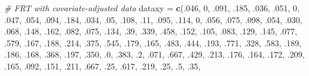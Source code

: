\documentclass[]{article}
\newenvironment{Shaded}{\begin{snugshade}}{\end{snugshade}}
\newcommand{\KeywordTok}[1]{\textcolor[rgb]{0.13,0.29,0.53}{\textbf{#1}}}
\newcommand{\DecValTok}[1]{\textcolor[rgb]{0.00,0.00,0.81}{#1}}
\newcommand{\StringTok}[1]{\textcolor[rgb]{0.31,0.60,0.02}{#1}}
\newcommand{\CommentTok}[1]{\textcolor[rgb]{0.56,0.35,0.01}{\textit{#1}}}
\newcommand{\NormalTok}[1]{#1}
\begin{document}
\begin{Shaded}
\begin{Highlighting}[]
\CommentTok{# FRT with covariate-adjusted data}
\NormalTok{dataxy =}\StringTok{ }\KeywordTok{c}\NormalTok{(.}\DecValTok{046}\NormalTok{, }\DecValTok{0}\NormalTok{, .}\DecValTok{091}\NormalTok{, .}\DecValTok{185}\NormalTok{, .}\DecValTok{036}\NormalTok{, .}\DecValTok{051}\NormalTok{, }\DecValTok{0}\NormalTok{, .}\DecValTok{047}\NormalTok{,}
\NormalTok{           .}\DecValTok{054}\NormalTok{, .}\DecValTok{094}\NormalTok{, .}\DecValTok{184}\NormalTok{, .}\DecValTok{034}\NormalTok{, .}\DecValTok{05}\NormalTok{, .}\DecValTok{108}\NormalTok{, .}\DecValTok{11}\NormalTok{, .}\DecValTok{095}\NormalTok{,}
\NormalTok{           .}\DecValTok{114}\NormalTok{, }\DecValTok{0}\NormalTok{, .}\DecValTok{056}\NormalTok{, .}\DecValTok{075}\NormalTok{, .}\DecValTok{098}\NormalTok{, .}\DecValTok{054}\NormalTok{, .}\DecValTok{030}\NormalTok{, .}\DecValTok{068}\NormalTok{,}
\NormalTok{           .}\DecValTok{148}\NormalTok{, .}\DecValTok{162}\NormalTok{, .}\DecValTok{082}\NormalTok{, .}\DecValTok{075}\NormalTok{, .}\DecValTok{134}\NormalTok{, .}\DecValTok{39}\NormalTok{, .}\DecValTok{339}\NormalTok{, .}\DecValTok{458}\NormalTok{,}
\NormalTok{           .}\DecValTok{152}\NormalTok{, .}\DecValTok{105}\NormalTok{, .}\DecValTok{083}\NormalTok{, .}\DecValTok{129}\NormalTok{, .}\DecValTok{145}\NormalTok{, .}\DecValTok{077}\NormalTok{, .}\DecValTok{579}\NormalTok{, .}\DecValTok{167}\NormalTok{, }
\NormalTok{           .}\DecValTok{188}\NormalTok{, .}\DecValTok{214}\NormalTok{, .}\DecValTok{375}\NormalTok{, .}\DecValTok{545}\NormalTok{, .}\DecValTok{179}\NormalTok{, .}\DecValTok{165}\NormalTok{, .}\DecValTok{483}\NormalTok{, .}\DecValTok{444}\NormalTok{,}
\NormalTok{           .}\DecValTok{193}\NormalTok{, .}\DecValTok{771}\NormalTok{, .}\DecValTok{328}\NormalTok{, .}\DecValTok{583}\NormalTok{, .}\DecValTok{189}\NormalTok{, .}\DecValTok{186}\NormalTok{, .}\DecValTok{168}\NormalTok{, .}\DecValTok{368}\NormalTok{,}
\NormalTok{           .}\DecValTok{197}\NormalTok{, .}\DecValTok{350}\NormalTok{, .}\DecValTok{0}\NormalTok{, .}\DecValTok{383}\NormalTok{, .}\DecValTok{2}\NormalTok{, .}\DecValTok{071}\NormalTok{, .}\DecValTok{667}\NormalTok{, .}\DecValTok{429}\NormalTok{,}
\NormalTok{           .}\DecValTok{213}\NormalTok{, .}\DecValTok{176}\NormalTok{, .}\DecValTok{164}\NormalTok{, .}\DecValTok{172}\NormalTok{, .}\DecValTok{209}\NormalTok{, .}\DecValTok{165}\NormalTok{, .}\DecValTok{092}\NormalTok{, .}\DecValTok{151}\NormalTok{,}
\NormalTok{           .}\DecValTok{211}\NormalTok{, .}\DecValTok{667}\NormalTok{, .}\DecValTok{25}\NormalTok{, .}\DecValTok{617}\NormalTok{, .}\DecValTok{219}\NormalTok{, .}\DecValTok{25}\NormalTok{, .}\DecValTok{5}\NormalTok{, .}\DecValTok{35}\NormalTok{,}

\end{Highlighting}
\end{Shaded}
\end{document}
